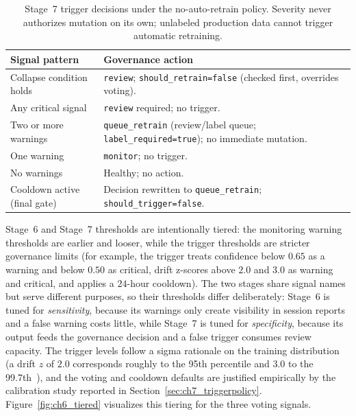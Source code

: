 \renewcommand{\arraystretch}{1.2}
\begin{table}[htbp]
\centering
\footnotesize
\caption[Stage~7 trigger decisions under the no-auto-retrain policy]{Stage~7 trigger decisions under the no-auto-retrain policy. Severity never authorizes
mutation on its own; unlabeled production data cannot trigger automatic retraining.}
\label{tab:trigger_decisions}
\begin{tabularx}{\textwidth}{p{4.2cm} X}
\toprule
\textbf{Signal pattern} & \textbf{Governance action} \\
\midrule
Collapse condition holds & \texttt{review}; \texttt{should\_retrain=false} (checked first, overrides voting). \\
Any critical signal & \texttt{review} required; no trigger. \\
Two or more warnings & \texttt{queue\_retrain} (review/label queue; \texttt{label\_required=true}); no immediate mutation. \\
One warning & \texttt{monitor}; no trigger. \\
No warnings & Healthy; no action. \\
Cooldown active (final gate) & Decision rewritten to \texttt{queue\_retrain}; \texttt{should\_trigger=false}. \\
\bottomrule
\end{tabularx}
\renewcommand{\arraystretch}{1.0}
\end{table}

Stage~6 and Stage~7 thresholds are intentionally tiered: the monitoring warning thresholds are
earlier and looser, while the trigger thresholds are stricter governance limits (for example, the
trigger treats confidence below \(0.65\) as a warning and below \(0.50\) as critical, drift z-scores
above \(2.0\) and \(3.0\) as warning and critical, and applies a \(24\)-hour cooldown). The two
stages share signal names but serve different purposes, so their thresholds differ deliberately:
Stage~6 is tuned for \emph{sensitivity}, because its warnings only create visibility in session
reports and a false warning costs little, while Stage~7 is tuned for \emph{specificity}, because its
output feeds the governance decision and a false trigger consumes review capacity. The trigger
levels follow a sigma rationale on the training distribution (a drift $z$ of \(2.0\) corresponds
roughly to the 95th percentile and \(3.0\) to the 99.7th~\cite{page1954cusum}), and the voting and
cooldown defaults are justified empirically by the calibration study reported in
Section~\ref{sec:ch7_triggerpolicy}.
Figure~\ref{fig:ch6_tiered} visualizes this tiering for the three voting signals.

